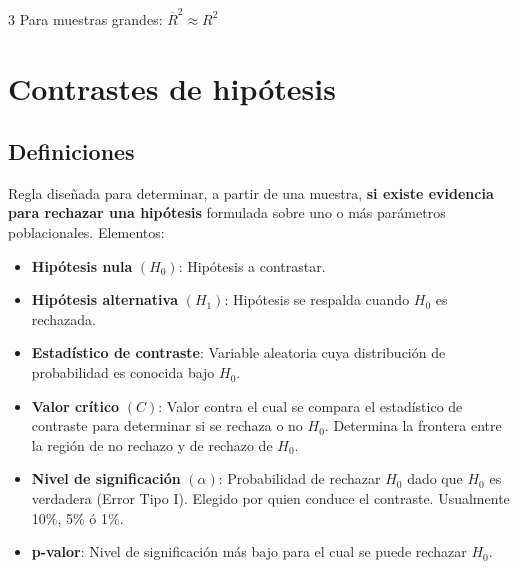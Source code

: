 \documentclass[10pt, a4paper, landscape]{article}
\begin{document}
\begin{multicols}{3}
Para muestras grandes: \( \overline{R}^{2} \approx R^{2} \)

\section*{Contrastes de hipótesis}

\subsection*{Definiciones}

Regla diseñada para determinar, a partir de una muestra, \textbf{si existe evidencia para rechazar una hipótesis} formulada sobre uno o más parámetros poblacionales. Elementos:

\begin{itemize}[leftmargin=*]
	\item \textbf{Hipótesis nula} \( (H_{0}) \): Hipótesis a contrastar.
	\item \textbf{Hipótesis alternativa} \( (H_{1}) \): Hipótesis se respalda cuando \( H_{0} \) es rechazada.
	\item \textbf{Estadístico de contraste}: Variable aleatoria cuya distribución de probabilidad es conocida bajo \( H_{0} \).
	\item \textbf{Valor crítico} \( (C) \): Valor contra el cual se compara el estadístico de contraste para determinar si se rechaza o no \( H_{0} \). Determina la frontera entre la región de no rechazo y de rechazo de \( H_{0} \).
	\item \textbf{Nivel de significación} \( (\alpha) \): Probabilidad de rechazar \( H_{0} \) dado que \( H_{0} \) es verdadera (Error Tipo I). Elegido por quien conduce el contraste. Usualmente 10\%, 5\% ó 1\%.
	\item \textbf{p-valor}: Nivel de significación más bajo para el cual se puede rechazar \( H_{0} \).
\end{itemize}


\end{multicols}
\end{document}
